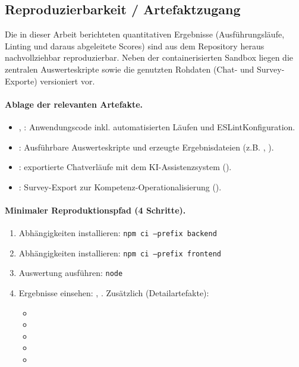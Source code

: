 \subsection{Reproduzierbarkeit / Artefaktzugang}
Die in dieser Arbeit berichteten quantitativen Ergebnisse (Ausführungsläufe, Linting und daraus abgeleitete Scores) sind aus dem Repository heraus nachvollziehbar reproduzierbar. Neben der containerisierten Sandbox liegen die zentralen Auswerteskripte sowie die genutzten Rohdaten (Chat- und Survey-Exporte) versioniert vor.

\paragraph{Ablage der relevanten Artefakte.}
\begin{itemize}
    \item {}, : Anwendungscode inkl. automatisierten Läufen und ESLintKonfiguration.
    \item {}: Ausführbare Auswerteskripte und erzeugte Ergebnisdateien (z.B. , ).
    \item {}: exportierte Chatverläufe mit dem KI-Assistenzsystem ().
    \item {}: Survey-Export zur Kompetenz-Operationalisierung ().
\end{itemize}

\paragraph{Minimaler Reproduktionspfad (4 Schritte).}
\begin{sloppypar}
\begin{enumerate}
    \item Abhängigkeiten installieren: \texttt{npm ci --prefix backend}
    \item Abhängigkeiten installieren: \texttt{npm ci --prefix frontend}
    \item Auswertung ausführen: \texttt{node} 
    \item Ergebnisse einsehen: , .
    Zusätzlich (Detailartefakte):
    \begin{itemize}
        \item {}
        \item {}
        \item {}
        \item {}
        \item {}
    \end{itemize}
\end{enumerate}
\end{sloppypar}

